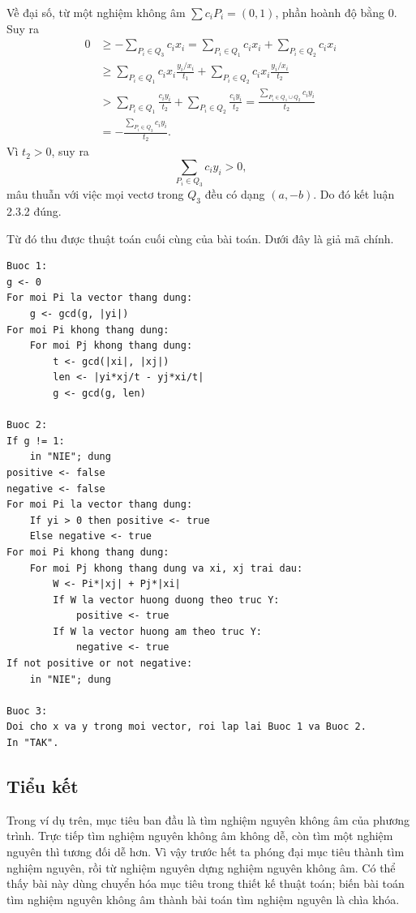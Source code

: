 \documentclass[11pt]{article}
\begin{document}
Về đại số, từ một nghiệm không âm \(\sum c_iP_i=(0,1)\), phần hoành độ bằng
\(0\). Suy ra
\[
\begin{aligned}
0
&\ge -\sum_{P_i\in Q_3}c_ix_i
 = \sum_{P_i\in Q_1}c_ix_i+\sum_{P_i\in Q_2}c_ix_i\\
&\ge
  \sum_{P_i\in Q_1} c_ix_i\frac{y_i/x_i}{t_1}
 +\sum_{P_i\in Q_2} c_ix_i\frac{y_i/x_i}{t_2}\\
&>
  \sum_{P_i\in Q_1} \frac{c_iy_i}{t_2}
 +\sum_{P_i\in Q_2} \frac{c_iy_i}{t_2}
 =
  \frac{\sum_{P_i\in Q_1\cup Q_2}c_iy_i}{t_2}\\
&=
  -\frac{\sum_{P_i\in Q_3}c_iy_i}{t_2}.
\end{aligned}
\]
Vì \(t_2>0\), suy ra
\[
  \sum_{P_i\in Q_3}c_iy_i>0,
\]
mâu thuẫn với việc mọi vectơ trong \(Q_3\) đều có dạng \((a,-b)\). Do đó kết
luận 2.3.2 đúng.

Từ đó thu được thuật toán cuối cùng của bài toán. Dưới đây là giả mã chính.

\begin{verbatim}
Buoc 1:
g <- 0
For moi Pi la vector thang dung:
    g <- gcd(g, |yi|)
For moi Pi khong thang dung:
    For moi Pj khong thang dung:
        t <- gcd(|xi|, |xj|)
        len <- |yi*xj/t - yj*xi/t|
        g <- gcd(g, len)

Buoc 2:
If g != 1:
    in "NIE"; dung
positive <- false
negative <- false
For moi Pi la vector thang dung:
    If yi > 0 then positive <- true
    Else negative <- true
For moi Pi khong thang dung:
    For moi Pj khong thang dung va xi, xj trai dau:
        W <- Pi*|xj| + Pj*|xi|
        If W la vector huong duong theo truc Y:
            positive <- true
        If W la vector huong am theo truc Y:
            negative <- true
If not positive or not negative:
    in "NIE"; dung

Buoc 3:
Doi cho x va y trong moi vector, roi lap lai Buoc 1 va Buoc 2.
In "TAK".
\end{verbatim}

\subsection{Tiểu kết}

Trong ví dụ trên, mục tiêu ban đầu là tìm nghiệm nguyên không âm của phương
trình. Trực tiếp tìm nghiệm nguyên không âm không dễ, còn tìm một nghiệm
nguyên thì tương đối dễ hơn. Vì vậy trước hết ta phóng đại mục tiêu thành tìm
nghiệm nguyên, rồi từ nghiệm nguyên dựng nghiệm nguyên không âm. Có thể thấy
bài này dùng chuyển hóa mục tiêu trong thiết kế thuật toán; biến bài toán tìm
nghiệm nguyên không âm thành bài toán tìm nghiệm nguyên là chìa khóa.
\end{document}
